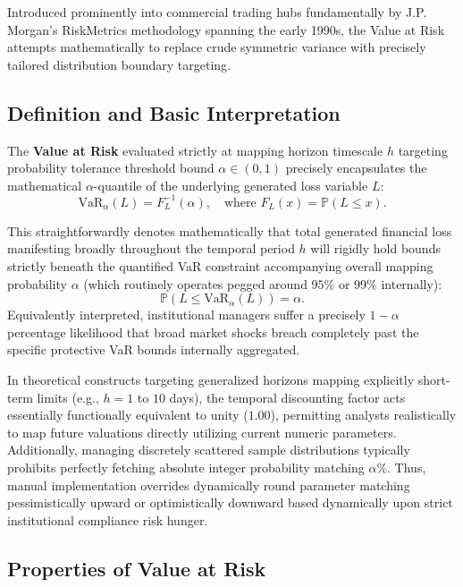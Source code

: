 Introduced prominently into commercial trading hubs fundamentally by J.P. Morgan's RiskMetrics methodology spanning the early 1990s, the Value at Risk attempts mathematically to replace crude symmetric variance with precisely tailored distribution boundary targeting.

\subsection{Definition and Basic Interpretation}

\begin{definition}
The \textbf{Value at Risk} evaluated strictly at mapping horizon timescale $h$ targeting probability tolerance threshold bound $\alpha \in (0, 1)$ precisely encapsulates the mathematical $\alpha$-quantile of the underlying generated loss variable $L$:
$$
\text{VaR}_\alpha(L) = F_L^{-1}(\alpha), \quad \text{where } F_L(x) = \mathbb{P}(L \leq x).
$$
\end{definition}

This straightforwardly denotes mathematically that total generated financial loss manifesting broadly throughout the temporal period $h$ will rigidly hold bounds strictly beneath the quantified VaR constraint accompanying overall mapping probability $\alpha$ (which routinely operates pegged around $95\%$ or $99\%$ internally):
$$
\mathbb{P}(L \leq \text{VaR}_\alpha(L)) = \alpha.
$$
Equivalently interpreted, institutional managers suffer a precisely $1 - \alpha$ percentage likelihood that broad market shocks breach completely past the specific protective VaR bounds internally aggregated.

\begin{remark}
In theoretical constructs targeting generalized horizons mapping explicitly short-term limits (e.g., $h = 1$ to $10$ days), the temporal discounting factor acts essentially functionally equivalent to unity ($1.00$), permitting analysts realistically to map future valuations directly utilizing current numeric parameters. 
Additionally, managing discretely scattered sample distributions typically prohibits perfectly fetching absolute integer probability matching $\alpha\%$. Thus, manual implementation overrides dynamically round parameter matching pessimistically upward or optimistically downward based dynamically upon strict institutional compliance risk hunger.
\end{remark}

\subsection{Properties of Value at Risk}

